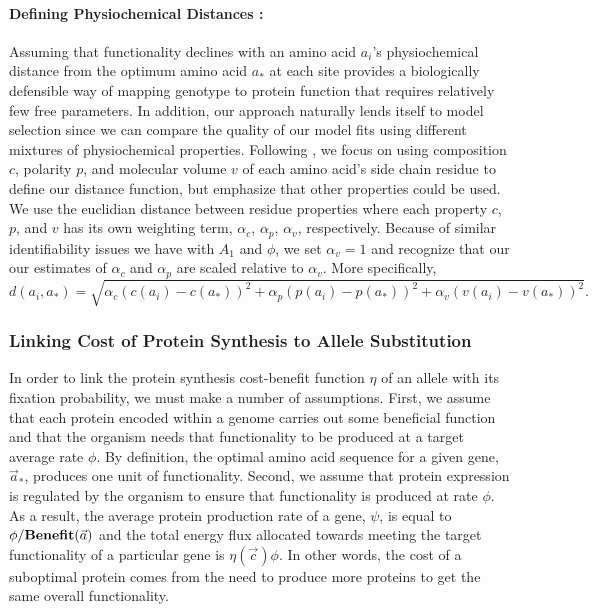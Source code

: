 \documentclass{article}
\newcommand{\Func}{\ensuremath{\text{\textbf{Benefit}}}\xspace}
\newcommand{\alphac}{\ensuremath{\alpha_c}\xspace}
\newcommand{\alphap}{\ensuremath{\alpha_p}\xspace}
\newcommand{\alphav}{\ensuremath{\alpha_v}\xspace}
\newcommand{\aopt}{\ensuremath{a_*}\xspace}
\newcommand{\aoptvec}{\ensuremath{\Vec{a}_*}\xspace}
\newcommand{\avec}{\ensuremath{\Vec{a}}\xspace}
\newcommand{\cvec}{\ensuremath{\Vec{c}}\xspace}
\begin{document}
\paragraph*{Defining Physiochemical Distances :}
Assuming that functionality declines with an amino acid $a_i$'s physiochemical distance from the optimum amino acid \aopt at each site  provides a biologically defensible way of mapping genotype to protein function that requires relatively few free parameters.
In addition, our approach naturally lends itself to model selection since we can compare the quality of our model fits using different mixtures of physiochemical properties.
Following \citet{Grantham1974}, we focus on using composition $c$, polarity $p$, and molecular volume $v$ of each amino acid's side chain residue to define our distance function, but emphasize that other properties could be used.
We use the euclidian distance between residue properties where each property $c$, $p$, and $v$ has its own weighting term, $\alphac$, $\alphap$, $\alphav$, respectively.
Because of similar identifiability issues we have with $A_1$ and $\phi$, we set $\alphav = 1$ and recognize that our our estimates of $\alphac$ and $\alphap$ are scaled relative to $\alphav$.
More specifically,
\begin{equation*}
  d(a_i, \aopt) = \sqrt{\alphac \left(c\left(a_i\right) - c\left(\aopt\right)\right)^2 + \alphap \left(p\left(a_i\right) - p\left(\aopt\right)\right)^2 +  \alphav \left(v\left(a_i\right) - v\left(\aopt\right)\right)^2}.
\end{equation*}


\subsubsection*{Linking Cost of Protein Synthesis to Allele Substitution}
In order to link the protein synthesis cost-benefit function $\eta$ of an allele with its fixation probability, we must make a number of assumptions.
First, we assume that each protein encoded within a genome carries out some beneficial function and that the organism needs that functionality to be produced at a target average rate $\phi$.
By definition, the optimal amino acid sequence for a given gene, \aoptvec, produces one unit of functionality.
Second, we assume that protein expression is regulated by the organism to ensure that functionality is produced at rate $\phi$.
As a result, the average protein production rate of a gene, $\psi$, is equal to $\phi/\Func(\avec)$ and the total energy flux allocated towards meeting the target functionality of a particular gene is $\eta(\cvec) \phi$. 
In other words, the cost of a suboptimal protein comes from the need to produce more proteins to get the same overall functionality.
\end{document}
